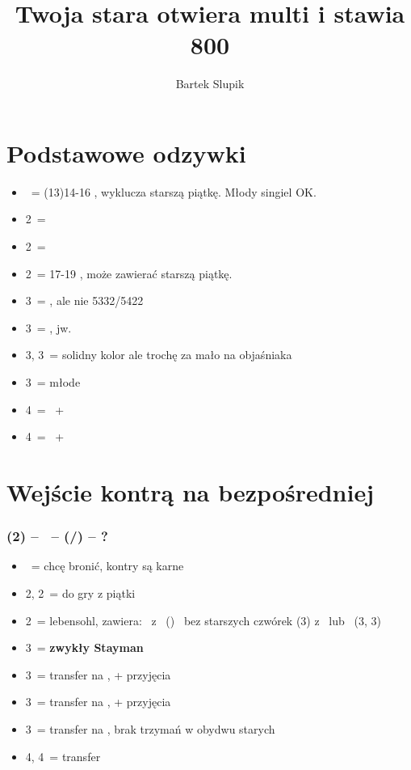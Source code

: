 \documentclass[12pt, a4paper]{article}
\title{Twoja stara otwiera multi i stawia 800}
\date{}
\author{Bartek Slupik}
\begin{document}
\maketitle
\section{Podstawowe odzywki}
\begin{itemize}
    \item \dbl\ = (13)14-16 \bal, wyklucza starszą piątkę. Młody singiel OK. \vimp
    \item 2\hearts\ = \hearts
    \item 2\spades\ = \spades
    \item 2\nt\ = 17-19 \bal, może zawierać starszą piątkę. \imp \br
    \item 3\clubs\ = \clubs, ale nie 5332/5422
    \item 3\diams\ = \diams, jw.
    \item 3\hearts, 3\spades\ = solidny kolor ale trochę za mało na objaśniaka
    \item 3\nt\ = młode \vimp
    \item 4\clubs\ = \clubs\ + \hearts\spades
    \item 4\diams\ = \diams\ + \hearts\spades
\end{itemize}

\pagebreak


\section{Wejście kontrą na bezpośredniej}
\subsubsection*{(2\diams) -- \dbl\ -- (\rdbl/\passx) -- ?}
\begin{itemize}
    \item \pass\ = chcę bronić, kontry są karne
    \item 2\hearts, 2\spades\ = do gry z piątki
    \item 2\nt\ = lebensohl, zawiera:
    \subitem \soff\ z \clubs\ (\pass)
    \subitem \gf\ bez starszych czwórek (3\diams) \vimp
    \subitem \inv z \hearts\ lub \spades\ (3\hearts, 3\spades)
    \item 3\clubs\ = \textbf{zwykły Stayman} \vimp
    \item 3\diams\ = transfer na \hearts, \gf + przyjęcia
    \item 3\hearts\ = transfer na \spades, \gf + przyjęcia \br
    \item 3\spades\ = transfer na \nt, brak trzymań w obydwu starych
    \item 4\diams, 4\hearts\ = transfer
\end{itemize}
\end{document}
